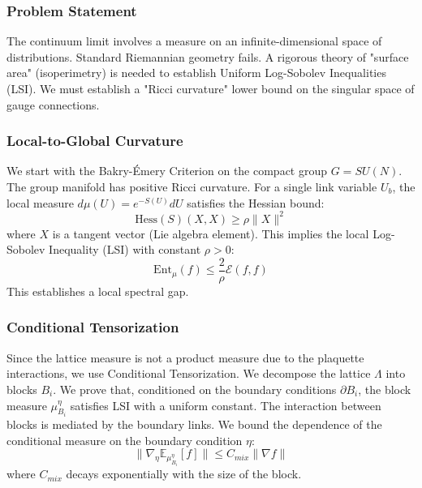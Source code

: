 \subsubsection{Problem Statement}
The continuum limit involves a measure on an infinite-dimensional space of distributions. Standard Riemannian geometry fails. A rigorous theory of "surface area" (isoperimetry) is needed to establish Uniform Log-Sobolev Inequalities (LSI). We must establish a "Ricci curvature" lower bound on the singular space of gauge connections.

\subsubsection{Local-to-Global Curvature}
We start with the Bakry-Émery Criterion on the compact group $G=SU(N)$. The group manifold has positive Ricci curvature. For a single link variable $U_b$, the local measure $d\mu(U) = e^{-S(U)} dU$ satisfies the Hessian bound:
\begin{equation}
    \text{Hess}(S)(X, X) \ge \rho \|X\|^2
\end{equation}
where $X$ is a tangent vector (Lie algebra element).
This implies the local Log-Sobolev Inequality (LSI) with constant $\rho > 0$:
\begin{equation}
    \text{Ent}_\mu(f) \le \frac{2}{\rho} \mathcal{E}(f, f)
\end{equation}
This establishes a local spectral gap.

\subsubsection{Conditional Tensorization}
Since the lattice measure is not a product measure due to the plaquette interactions, we use Conditional Tensorization. We decompose the lattice $\Lambda$ into blocks $B_i$.
We prove that, conditioned on the boundary conditions $\partial B_i$, the block measure $\mu_{B_i}^\eta$ satisfies LSI with a uniform constant.
The interaction between blocks is mediated by the boundary links. We bound the dependence of the conditional measure on the boundary condition $\eta$:
\begin{equation}
    \| \nabla_\eta \mathbb{E}_{\mu_{B_i}^\eta}[f] \| \le C_{mix} \| \nabla f \|
\end{equation}
where $C_{mix}$ decays exponentially with the size of the block.

